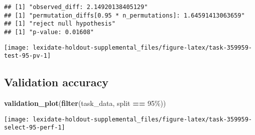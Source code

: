 \documentclass[
]{book}
\newenvironment{Shaded}{\begin{snugshade}}{\end{snugshade}}
\newcommand{\AttributeTok}[1]{\textcolor[rgb]{0.13,0.29,0.53}{#1}}
\newcommand{\DecValTok}[1]{\textcolor[rgb]{0.00,0.00,0.81}{#1}}
\newcommand{\FunctionTok}[1]{\textcolor[rgb]{0.13,0.29,0.53}{\textbf{#1}}}
\newcommand{\NormalTok}[1]{#1}
\newcommand{\OtherTok}[1]{\textcolor[rgb]{0.56,0.35,0.01}{#1}}
\newcommand{\SpecialCharTok}[1]{\textcolor[rgb]{0.81,0.36,0.00}{\textbf{#1}}}
\newcommand{\StringTok}[1]{\textcolor[rgb]{0.31,0.60,0.02}{#1}}
\begin{document}
\begin{Shaded}
\end{Shaded}

\begin{verbatim}
## [1] "observed_diff: 2.14920138405129"
## [1] "permutation_diffs[0.95 * n_permutations]: 1.64591413063659"
## [1] "reject null hypothesis"
## [1] "p-value: 0.01608"
\end{verbatim}

\texttt{[image: lexidate-holdout-supplemental\_files/figure-latex/task-359959-test-95-pv-1]}

\hypertarget{validation-accuracy-39}{%
\subsection{Validation accuracy}\label{validation-accuracy-39}}

\begin{Shaded}
\begin{Highlighting}[]
\FunctionTok{validation\_plot}\NormalTok{(}\FunctionTok{filter}\NormalTok{(task\_data, split }\SpecialCharTok{==} \StringTok{\textquotesingle{}95\%\textquotesingle{}}\NormalTok{))}
\end{Highlighting}
\end{Shaded}

\texttt{[image: lexidate-holdout-supplemental\_files/figure-latex/task-359959-select-95-perf-1]}
\end{document}

